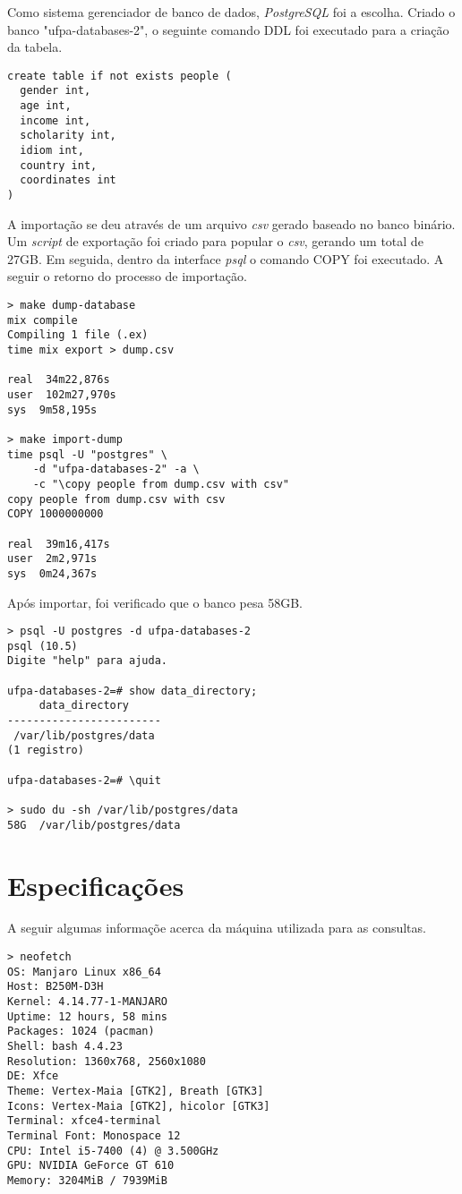 \documentclass[12pt]{article}
\begin{document}
Como sistema gerenciador de banco de dados, \textit{PostgreSQL} foi a escolha. Criado o banco "ufpa-databases-2",
o seguinte comando DDL foi executado para a criação da tabela.

\begin{verbatim}
create table if not exists people (
  gender int,
  age int,
  income int,
  scholarity int,
  idiom int,
  country int,
  coordinates int
)
\end{verbatim}

A importação se deu através de um arquivo \textit{csv} gerado baseado no banco binário. Um \textit{script}
de exportação foi criado para popular o \textit{csv}, gerando um total de 27GB. Em seguida,
dentro da interface \textit{psql} o comando COPY foi executado. A seguir o retorno do
processo de importação.

\begin{verbatim}
> make dump-database
mix compile
Compiling 1 file (.ex)
time mix export > dump.csv

real  34m22,876s
user  102m27,970s
sys  9m58,195s

> make import-dump
time psql -U "postgres" \
    -d "ufpa-databases-2" -a \
    -c "\copy people from dump.csv with csv"
copy people from dump.csv with csv
COPY 1000000000

real  39m16,417s
user  2m2,971s
sys  0m24,367s
\end{verbatim}

Após importar, foi verificado que o banco pesa 58GB.

\begin{verbatim}
> psql -U postgres -d ufpa-databases-2
psql (10.5)
Digite "help" para ajuda.

ufpa-databases-2=# show data_directory;
     data_directory     
------------------------
 /var/lib/postgres/data
(1 registro)

ufpa-databases-2=# \quit

> sudo du -sh /var/lib/postgres/data
58G  /var/lib/postgres/data
\end{verbatim}

\section{Especificações}

A seguir algumas informaçõe acerca da máquina utilizada para as consultas.

\begin{verbatim}
> neofetch
OS: Manjaro Linux x86_64 
Host: B250M-D3H 
Kernel: 4.14.77-1-MANJARO 
Uptime: 12 hours, 58 mins 
Packages: 1024 (pacman) 
Shell: bash 4.4.23 
Resolution: 1360x768, 2560x1080 
DE: Xfce 
Theme: Vertex-Maia [GTK2], Breath [GTK3] 
Icons: Vertex-Maia [GTK2], hicolor [GTK3] 
Terminal: xfce4-terminal 
Terminal Font: Monospace 12 
CPU: Intel i5-7400 (4) @ 3.500GHz 
GPU: NVIDIA GeForce GT 610 
Memory: 3204MiB / 7939MiB
\end{verbatim}
\end{document}
